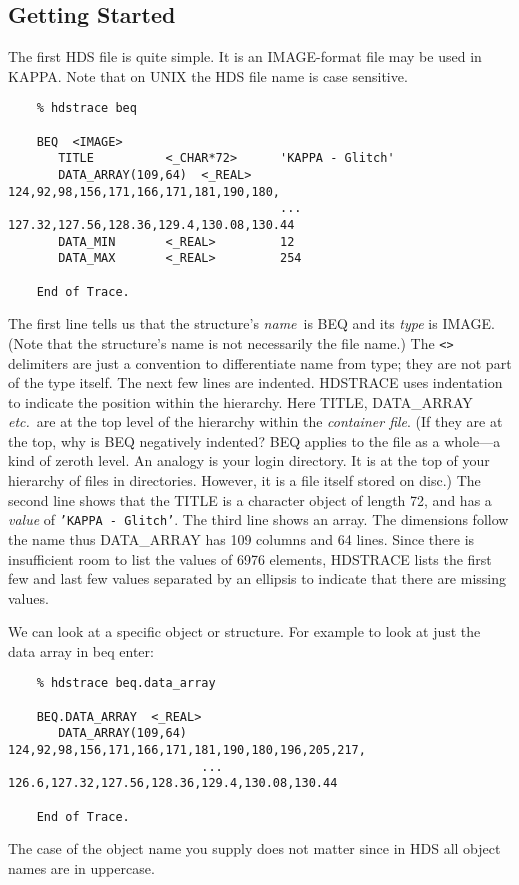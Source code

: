 \subsection{Getting Started}
The first HDS file is quite simple.  It is an IMAGE-format file may be
used in {\footnotesize KAPPA}.  Note that on UNIX the HDS file name
is case sensitive.

\small
\begin{verbatim}
    % hdstrace beq

    BEQ  <IMAGE>
       TITLE          <_CHAR*72>      'KAPPA - Glitch'
       DATA_ARRAY(109,64)  <_REAL>    124,92,98,156,171,166,171,181,190,180,
                                      ... 127.32,127.56,128.36,129.4,130.08,130.44
       DATA_MIN       <_REAL>         12
       DATA_MAX       <_REAL>         254

    End of Trace.
\end{verbatim}
\normalsize
The first line tells us that the structure's {\em name}\ is BEQ and its
{\em type\/} is IMAGE.  (Note that the structure's name is not
necessarily the file name.)  The {\tt <>} delimiters are just a
convention to differentiate name from type; they are not part of the
type itself.  The next few lines are indented.  {\footnotesize HDSTRACE}
uses indentation to indicate the position within the hierarchy.  Here
TITLE, DATA\_ARRAY {\it etc.}\ are at the top level of the hierarchy
within the {\em container file}.  (If they are at the top, why is BEQ
negatively indented?  BEQ applies to the file as a whole---a kind of
zeroth level. An analogy is your login directory.  It is at the top of
your hierarchy of files in directories.  However, it is a file itself
stored on disc.) The second line shows that the TITLE is a character
object of length 72, and has a {\em value\/} of {\tt 'KAPPA - Glitch'}.
The third line shows an array.  The dimensions follow the name thus
DATA\_ARRAY has 109 columns and 64 lines.  Since there is insufficient
room to list the values of 6976 elements, {\footnotesize HDSTRACE} lists
the first few and last few values separated by an ellipsis to indicate
that there are missing values.

We can look at a specific object or structure.  For example to look
at just the data array in beq enter:

\small
\begin{verbatim}
    % hdstrace beq.data_array

    BEQ.DATA_ARRAY  <_REAL>
       DATA_ARRAY(109,64)  124,92,98,156,171,166,171,181,190,180,196,205,217,
                           ... 126.6,127.32,127.56,128.36,129.4,130.08,130.44

    End of Trace.
\end{verbatim}
\normalsize
The case of the object name you supply does not matter since in HDS all
object names are in uppercase.

